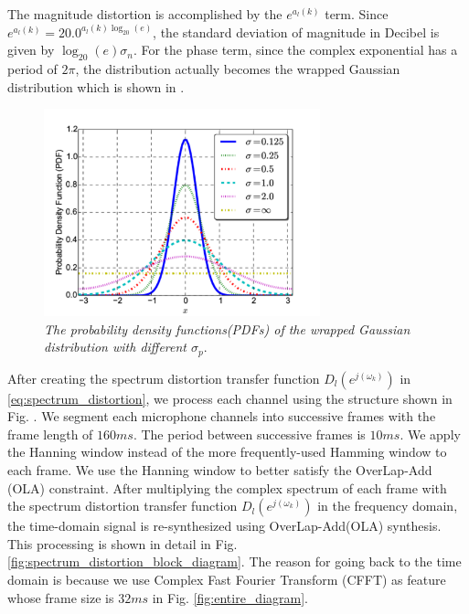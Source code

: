 \documentclass[a4paper]{article}
\begin{document}
The magnitude distortion is accomplished by the $e^{a_l(k)}$ term. Since
$e^{a_l(k)} = 20.0 ^ {a_l(k) \log_{20}(e)}$,
the standard deviation of magnitude in Decibel is
given by $\log_{20}(e) \sigma_n$. For the phase term, since
the complex exponential has a period of $2 \pi$, the distribution
actually becomes the wrapped Gaussian distribution which is shown
in \label{fig:wrapped_gaussian_pdf}
\cite{E_Breitenberger_Biometrika_1963}.
%
%
\begin{figure}
  \includegraphics[width=80mm]{wrapped_gaussian_pdf}
  \caption{\label{fig:wrapped_gaussian_pdf} \emph{
    The probability density functions(PDFs) of the wrapped Gaussian
    distribution with different $\sigma_p$}.}
\end{figure}
%
%
%
After creating the spectrum distortion transfer function $D_l\left(e^{j(\omega_k)}\right)$
in \eqref{eq:spectrum_distortion}, we process each channel using the
structure shown in Fig. \label{eq:spectrum_distortion_block_diagram}.
We segment each microphone channels into successive frames with the
frame length of $160 ms$. The period between successive frames is $10 ms$.
We apply the Hanning window instead of the more frequently-used Hamming window
to each frame. We use the Hanning window to better satisfy the OverLap-Add (OLA)
constraint. After multiplying the complex spectrum of each frame with the
spectrum distortion transfer function $D_l\left(e^{j(\omega_k)}\right)$
in the frequency domain, the time-domain signal is re-synthesized
using OverLap-Add(OLA) synthesis. This processing is shown in detail
in Fig. \ref{fig:spectrum_distortion_block_diagram}. The reason for
going back to the time domain is because we use Complex Fast Fourier
Transform (CFFT) as feature whose frame size is $32 ms$ in Fig.
\ref{fig:entire_diagram}. 




%
%
\end{document}
